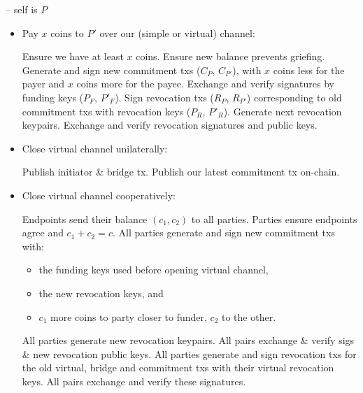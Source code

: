 \begin{center}
\begin{processbox}{\pchan -- self is $P$}
\begin{itemize}
      \item Pay $x$ coins to $P'$ over our (simple or virtual) channel:
      \begin{algorithmic}[0]
        \State Ensure we have at least $x$ coins.
          \State Ensure new balance prevents griefing.
        \EndIf
        \State Generate and sign new commitment txs ($C_P$, $C_{P'}$), with $x$ coins less for the
        payer and $x$ coins more for the payee.
        \State Exchange and verify signatures by funding keys ($P_F$, $P'_F$).
        \State Sign revocation txs ($R_P$, $R_{P'}$) corresponding to old
        commitment txs with revocation keys ($P_R$, $P'_R$).
        \State Generate next revocation keypairs.
        \State Exchange and verify revocation signatures and public keys.
      \end{algorithmic}

      \item Close virtual channel unilaterally:
      \begin{algorithmic}[0]
        \State Publish initiator \& bridge tx. 
        \State Publish our latest commitment tx on-chain.
      \end{algorithmic}

      \item Close virtual channel cooperatively: 
      \begin{algorithmic}[0]
        \State Endpoints send their balance $(c_1, c_2)$ to all
        parties.
        \State Parties ensure endpoints agree and $c_1 + c_2 = c$.
        \State All parties generate and sign new commitment txs with:
        \begin{itemize}
          \item the funding keys used before opening virtual channel,
          \item the new revocation keys, and
          \item $c_1$ more coins to party closer to funder, $c_2$ to the
          other.
        \end{itemize}
        \State All parties generate new revocation keypairs.
        \State All pairs exchange \& verify sigs \& new revocation public keys.
        \State All parties generate and sign revocation txs for the old virtual,
        bridge and commitment txs with their virtual revocation keys.
        \State All pairs exchange and verify these signatures.
      \end{algorithmic}


\end{itemize}
\end{processbox}
\end{center}
